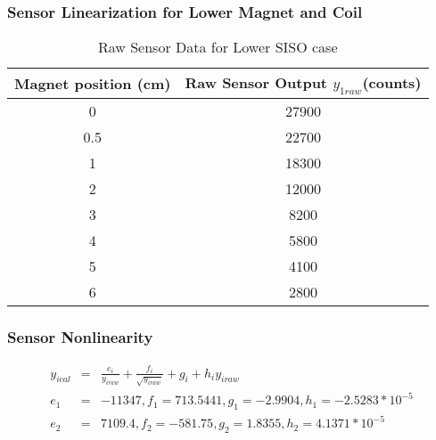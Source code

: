 \documentclass{beamer}
\begin{document}




\begin{frame}
\frametitle{Sensor Linearization for Lower Magnet and Coil}
\begin{table}
  \centering
  \caption{Raw Sensor Data for Lower SISO case}
  \begin{tabular}{|c|c|}
\hline
    \textbf{Magnet position (cm)} & \textbf{Raw Sensor Output $y_{1raw}$(counts)} \\ \hline
    0 & 27900 \\ \hline
    0.5 & 22700 \\ \hline
    1 & 18300 \\ \hline
    2 & 12000 \\ \hline
    3 & 8200 \\ \hline
    4 & 5800 \\ \hline
    5 & 4100 \\ \hline
    6 & 2800 \\ \hline
  \end{tabular}
\end{table}
\end{frame}

\begin{frame}
\frametitle{Sensor Nonlinearity}
\begin{eqnarray*}
  y_{ical}&=& \frac{e_{i}}{y_{iraw}}+\frac{f_{i}}{\sqrt{y_{iraw}}}+g_{i}+h_{i}y_{iraw}\\
  e_{1} &=& -11347,f_{1}=713.5441,g_{1}=-2.9904,h_{1}=-2.5283*10^{-5} \\
  e_{2} &=& 7109.4,f_{2}=-581.75,g_{2}=1.8355,h_{2}=4.1371*10^{-5}
\end{eqnarray*}
\end{frame}


\end{document}
